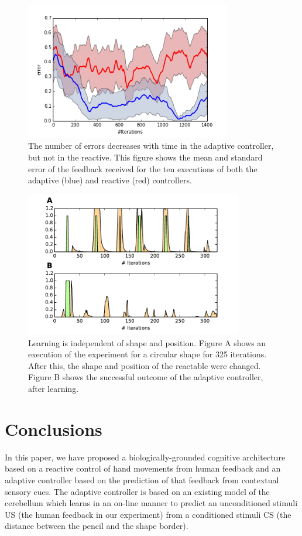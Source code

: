 \documentclass[letterpaper, 10 pt, conference]{ieeeconf}  %
\begin{document}
\begin{figure}
\centering
\includegraphics[width=9cm]{error}
\caption{The number of errors decreases with time in the adaptive controller, but not in the reactive. This figure shows the mean and standard error of the feedback received for the ten executions of both the adaptive (blue) and reactive (red) controllers. }
\label{fig:error}
\end{figure}

\begin{figure}
\centering
\includegraphics[width=9.5cm]{general}
\caption{Learning is independent of shape and position. Figure A shows an execution of the experiment for a circular shape for 325 iterations. After this, the shape and position of the reactable were changed. Figure B shows the successful outcome of the adaptive controller, after learning. }
\label{fig:general}
\end{figure}

\section{Conclusions}
\label{seq:conclusions}

In this paper, we have proposed a biologically-grounded cognitive architecture based on a reactive control of hand movements from human feedback and an adaptive controller based on the prediction of that feedback from contextual sensory cues. The adaptive controller is based on an existing model of the cerebellum which learns in an on-line manner to predict an unconditioned stimuli US (the human feedback in our experiment) from a conditioned stimuli CS (the distance between the pencil and the shape border). 
\end{document}
